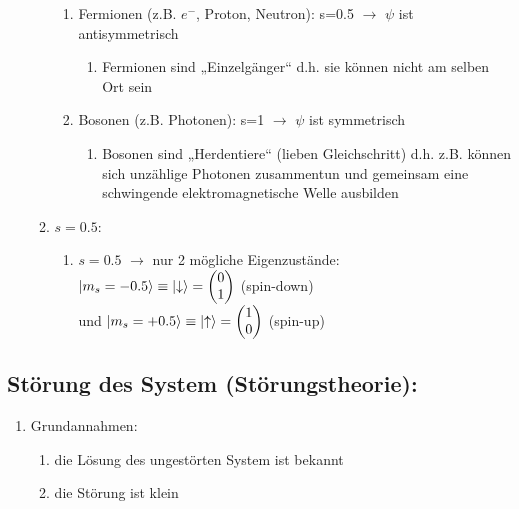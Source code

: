 \begin{enumerate}
\begin{enumerate}
\begin{enumerate}
    \item Fermionen (z.B. $e^-$, Proton, Neutron): s=0.5  $\rightarrow$ $\psi$ ist antisymmetrisch
    \begin{enumerate}
        \item Fermionen sind „Einzelgänger“ d.h. sie können nicht am selben Ort sein
    \end{enumerate}
    \item Bosonen (z.B. Photonen): s=1 $\rightarrow$ $\psi$ ist symmetrisch 
    \begin{enumerate}
        \item Bosonen sind „Herdentiere“ (lieben Gleichschritt) d.h. z.B.  können sich unzählige
        Photonen zusammentun und gemeinsam eine schwingende elektromagnetische Welle ausbilden 
    \end{enumerate}
\end{enumerate}
\item $s=0.5$:
\begin{enumerate}
    \item $s=0.5$ $\rightarrow$ nur 2 mögliche Eigenzustände: \\
    $\ket{m_s=-0.5}\equiv\ket{\downarrow}=\begin{pmatrix} 0\\ 1 \end{pmatrix}$  (spin-down) \\
    und $\ket{m_s=+0.5}\equiv\ket{\uparrow}=\begin{pmatrix} 1\\ 0\end{pmatrix}$ (spin-up)
\end{enumerate}
\end{enumerate}
\end{enumerate}



\subsection{Störung des System (Störungstheorie):}
\begin{enumerate}
    \item Grundannahmen:
    \begin{enumerate}
        \item die Lösung des ungestörten System ist bekannt
        \item die Störung ist klein
    \end{enumerate}
\end{enumerate}